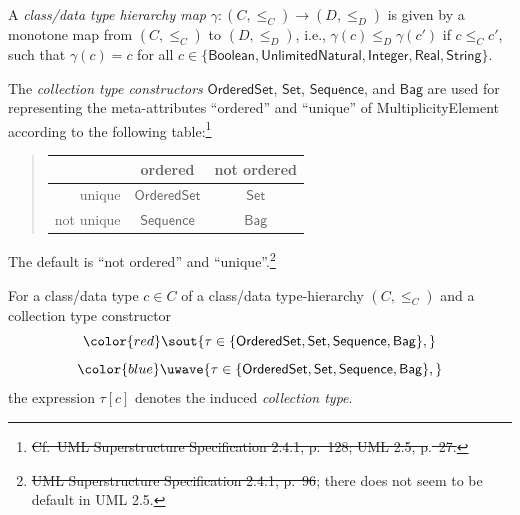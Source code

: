 \documentclass[10pt,fleqn,final]{scrreprt}
\newcommand{\uml}[1]{\textsf{#1}}
\providecommand{\DIFadd}[1]{{\protect\color{blue}\uwave{#1}}} %
\providecommand{\DIFdel}[1]{{\protect\color{red}\sout{#1}}}                      %
\providecommand{\DIFaddbegin}{} %
\providecommand{\DIFaddend}{} %
\providecommand{\DIFdelbegin}{} %
\providecommand{\DIFdelend}{} %
\begin{document}
A \emph{class/data type hierarchy map}
$\gamma : (C, {\leq_C}) \to (D, {\leq_D})$ is given by a monotone map
from $(C, {\leq_C})$ to $(D, {\leq_D})$, i.e.,
$\gamma(c) \leq_D \gamma(c')$ if $c \leq_C c'$, such that
$\gamma(c) = c$ for all
$c \in \{ \mathsf{Boolean},\allowbreak \mathsf{UnlimitedNatural},\allowbreak
\mathsf{Integer}, \mathsf{Real}, \mathsf{String} \}$.

\DIFdelbegin %
\DIFdelend The \emph{collection type constructors} $\mathsf{OrderedSet}$,
$\mathsf{Set}$, $\mathsf{Sequence}$, and $\mathsf{Bag}$ are used for
representing the meta-attributes ``ordered'' and ``unique'' of
\uml{MultiplicityElement} according to the following
table:\footnote{\DIFdelbegin \DIFdel{Cf.~UML Superstructure Specification 2.4.1, p.~128; UML
  2.5, p}\DIFdelend \DIFaddbegin \DIFadd{\mbox{%
\cite[p.~34]{uml-2.5}
}%
}\DIFaddend .\DIFdelbegin \DIFdel{~27.}\DIFdelend }
%
\begin{quotation}
\begin{tabular}{@{}r||c|c@{}}
             & ordered               & not ordered\\
\hline\hline
  unique     & $\mathsf{OrderedSet}$ & $\mathsf{Set}$\\
\hline
  not unique & $\mathsf{Sequence}$   & $\mathsf{Bag}$
\end{tabular}
\end{quotation}
%
The default is ``not ordered'' and
``unique''.\footnote{\DIFdelbegin \DIFdel{UML
  Superstructure Specification 2.4.1, p.~96}\DIFdelend \DIFaddbegin \DIFadd{\mbox{%
\cite[p.~96]{uml-2.4.1-super}
}%
}\DIFaddend ; there does not seem to be
  default in UML 2.5.}

For a class/data type $c \in C$ of a class/data type-hierarchy
$(C, {\leq_C})$ and a collection type constructor
\DIFdelbegin \begin{displaymath}\DIFdel{\tau \in \{ \mathsf{OrderedSet}, \mathsf{Set}, \mathsf{Sequence},
\mathsf{Bag} \},}\end{displaymath}
\DIFdelend %
\DIFaddbegin \begin{equation*}\DIFadd{
  \tau \in \{ \mathsf{OrderedSet}, \mathsf{Set}, \mathsf{Sequence},
\mathsf{Bag} \},
}\end{equation*}
\DIFaddend the expression $\tau[c]$ denotes the induced \emph{collection type}.
\end{document}
